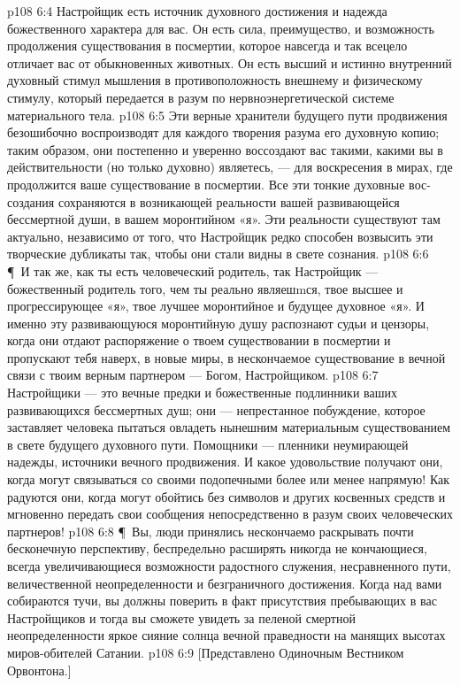 \vs p108 6:4 Настройщик есть источник духовного достижения и надежда божественного характера для вас. Он есть сила, преимущество, и возможность продолжения существования в посмертии, которое навсегда и так всецело отличает вас от обыкновенных животных. Он есть высший и истинно внутренний духовный стимул мышления в противоположность внешнему и физическому стимулу, который передается в разум по нервноэнергетической системе материального тела.
\vs p108 6:5 Эти верные хранители будущего пути продвижения безошибочно воспроизводят для каждого творения разума его духовную копию; таким образом, они постепенно и уверенно воссоздают вас такими, какими вы в действительности (но только духовно) являетесь, --- для воскресения в мирах, где продолжится ваше существование в посмертии. Все эти тонкие духовные вос\hyp{}создания сохраняются в возникающей реальности вашей развивающейся бессмертной души, в вашем моронтийном «я». Эти реальности существуют там актуально, независимо от того, что Настройщик редко способен возвысить эти творческие дубликаты так, чтобы они стали видны в свете сознания.
\vs p108 6:6 \P\ И так же, как ты есть человеческий родитель, так Настройщик --- божественный родитель того, чем ты реально являешmся, твое высшее и прогрессирующее «я», твое лучшее моронтийное и будущее духовное «я». И именно эту развивающуюся моронтийную душу распознают судьи и цензоры, когда они отдают распоряжение о твоем существовании в посмертии и пропускают тебя наверх, в новые миры, в нескончаемое существование в вечной связи с твоим верным партнером --- Богом, Настройщиком.
\vs p108 6:7 Настройщики --- это вечные предки и божественные подлинники ваших развивающихся бессмертных душ; они --- непрестанное побуждение, которое заставляет человека пытаться овладеть нынешним материальным существованием в свете будущего духовного пути. Помощники --- пленники неумирающей надежды, источники вечного продвижения. И какое удовольствие получают они, когда могут связываться со своими подопечными более или менее напрямую! Как радуются они, когда могут обойтись без символов и других косвенных средств и мгновенно передать свои сообщения непосредственно в разум своих человеческих партнеров!
\vs p108 6:8 \P\ Вы, люди принялись нескончаемо раскрывать почти бесконечную перспективу, беспредельно расширять никогда не кончающиеся, всегда увеличивающиеся возможности радостного служения, несравненного пути, величественной неопределенности и безграничного достижения. Когда над вами собираются тучи, вы должны поверить в факт присутствия пребывающих в вас Настройщиков и тогда вы сможете увидеть за пеленой смертной неопределенности яркое сияние солнца вечной праведности на манящих высотах миров\hyp{}обителей Сатании.
\vs p108 6:9 [Представлено Одиночным Вестником Орвонтона.]
